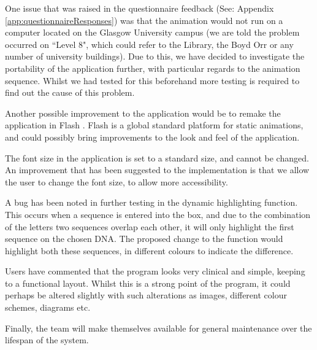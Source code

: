 One issue that was raised in the questionnaire feedback (See: Appendix \ref{app:questionnaireResponses}) was that the animation would not run on a computer located on the Glasgow University campus (we are told the problem occurred on ``Level 8", which could refer to the Library, the Boyd Orr or any number of university buildings). Due to this, we have decided to investigate the portability of the application further, with particular regards to the animation sequence. Whilst we had tested for this beforehand more testing is required to find out the cause of this problem.

Another possible improvement to the application would be to remake the application in Flash \cite{Flash}. Flash is a global standard platform for static animations, and could possibly bring improvements to the look and feel of the application. 

The font size in the application is set to a standard size, and cannot be changed. An improvement that has been suggested to the implementation is that we allow the user to change the font size, to allow more accessibility.

A bug has been noted in further testing in the dynamic highlighting function. This occurs when a sequence is entered into the box, and due to the combination of the letters two sequences overlap each other, it will only highlight the first sequence on the chosen DNA. The proposed change to the function would highlight both these sequences, in different colours to indicate the difference.

Users have commented that the program looks very clinical and simple, keeping to a functional layout. Whilst this is a strong point of the program, it could perhaps be altered slightly with such alterations as images, different colour schemes, diagrams etc.

Finally, the team will make themselves available for general maintenance over the lifespan of the system.
